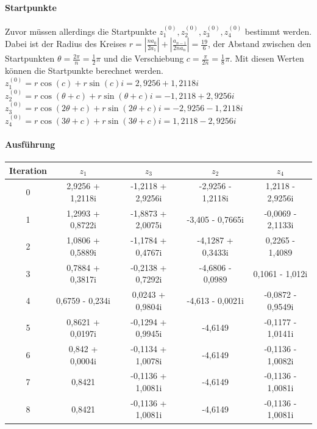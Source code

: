 \documentclass[12pt]{article}
\begin{document}
\paragraph{Startpunkte}
Zuvor müssen allerdings die Startpunkte $z_1^{(0)},z_2^{(0)},z_3^{(0)},z_4^{(0)}$ bestimmt werden. Dabei ist der Radius des Kreises $r = |\frac{na_0}{2a_1}| + |\frac{a_{n-1}}{2na_n}| = \frac{19}{6}$, der Abstand zwischen den Startpunkten $\theta = \frac{2\pi}{n} = \frac{1}{2}\pi$ und die Verschiebung $c = \frac{\pi}{2n} = \frac{1}{8}\pi$. Mit diesen Werten können die Startpunkte berechnet werden. \\
$z_1^{(0)} = r \cos(c) + r \sin(c)i = 2,9256 + 1,2118i$ \\
$z_2^{(0)} = r \cos(\theta+c) + r \sin(\theta+c)i = -1,2118 + 2,9256i$ \\
$z_3^{(0)} = r \cos(2\theta+c) + r \sin(2\theta+c)i = -2,9256 - 1,2118i$ \\
$z_4^{(0)} = r \cos(3\theta+c) + r \sin(3\theta+c)i = 1,2118 - 2,9256i$

\paragraph{Ausführung}
\begin{center}
\begin{tabular}{c|c c c c}
    Iteration & $z_1$ & $z_3$ & $z_2$ & $z_4$ \\
    \hline
    0 & 2,9256 + 1,2118i & -1,2118 + 2,9256i & -2,9256 - 1,2118i & 1,2118 - 2,9256i \\
    1 & 1,2993 + 0,8722i & -1,8873 + 2,0075i & -3,405 - 0,7665i & -0,0069 - 2,1133i \\
    2 & 1,0806 + 0,5889i & -1,1784 + 0,4767i & -4,1287 + 0,3433i & 0,2265 - 1,4089 \\
    3 & 0,7884 + 0,3817i & -0,2138 + 0,7292i & -4,6806 - 0,0989 & 0,1061 - 1,012i \\
    4 & 0,6759 - 0,234i & 0,0243 + 0,9804i & -4,613 - 0,0021i & -0,0872 - 0,9549i \\
    5 & 0,8621 + 0,0197i & -0,1294 + 0,9945i & -4,6149 & -0,1177 - 1,0141i \\
    6 & 0,842 + 0,0004i & -0,1134 + 1,0078i & -4,6149 & -0,1136 - 1,0082i \\
    7 & 0,8421 & -0,1136 + 1,0081i & -4,6149 & -0,1136 - 1,0081i \\
    8 & 0,8421 & -0,1136 + 1,0081i & -4,6149 & -0,1136 - 1,0081i \\
\end{tabular}
\end{center}
\end{document}

